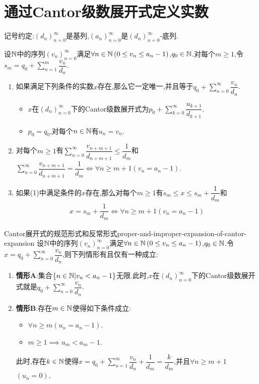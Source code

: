 \section{通过Cantor级数展开式定义实数}

记号约定:$\left(d_{n}\right)_{n=0}^{\infty}$是基列,$\left(a_{n}\right)_{n=0}^{\infty}$是$\left(d_{n}\right)_{n=0}^{\infty}$-底列.

\begin{lemma}{}{}
	设$\mathbb{N}$中的序列$\left(v_{n}\right)_{n=0}^{\infty}$满足$\forall n\in\mathbb{N}\left(0\leq v_{n}\leq a_{n}-1\right)$,$q_{0}\in\mathbb{N}$.对每个$m\geq 1$,令$s_{m}=q_{0}+\sum\limits_{n=1}^{m}\dfrac{v_{n}}{d_{n}}.$
	\begin{enumerate}
		\item 如果满足下列条件的实数$x$存在,那么它一定唯一,并且等于$q_{0}+\sum\limits_{n=0}^{\infty}\dfrac{v_{n}}{d_{n}}$.
		\begin{itemize}
			\item $x$在$\left(d_{n}\right)_{n=0}^{\infty}$下的Cantor级数展开式为$p_{0}+\sum\limits_{k=0}^{\infty}\dfrac{u_{k+1}}{d_{k+1}}$.
			\item $p_{0}=q_{0}$,对每个$n\in\mathbb{N}$有$u_{n}=v_{n}$.
		\end{itemize}
		\item 对每个$m\geq 1$有$\sum\limits_{n=0}^{\infty}\dfrac{v_{n+m+1}}{d_{n+m+1}}\leq\dfrac{1}{d_{m}}$和$\sum\limits_{n=0}^{\infty}\dfrac{v_{n+m+1}}{d_{n+m+1}}=\dfrac{1}{d_{m}}\iff\forall n\geq m+1\left(v_{n}=a_{n}-1\right)$.
		\item 如果(1)中满足条件的$x$存在,那么对每个$m\geq 1$有$s_{m}\leq x\leq s_{m}+\dfrac{1}{d_{m}}$和
		\begin{align*}
			x=s_{m}+\dfrac{1}{d_{m}}\iff\forall n\geq m+1\left(v_{n}=a_{n}-1\right)
		\end{align*}
	\end{enumerate}
\end{lemma}

\begin{theorem}{Cantor展开式的规范形式和反常形式}{proper-and-improper-expansion-of-cantor-expansion}
	设$\mathbb{N}$中的序列$\left(v_{n}\right)_{n=0}^{\infty}$满足$\forall n\in\mathbb{N}\left(0\leq v_{n}\leq a_{n}-1\right)$,$q_{0}\in\mathbb{N}$.令$x=q_{0}+\sum\limits_{n=0}^{\infty}\dfrac{v_{n}}{d_{n}}$,则下列情形有且仅有一种成立:
	\begin{enumerate}
		\item \textbf{情形A}:集合$\left\{n\in\mathbb{N}\middle|v_{n}<a_{n}-1\right\}$无限.此时,$x$在$\left(d_{n}\right)_{n=0}^{\infty}$下的Cantor级数展开式就是$q_{0}+\sum\limits_{n=0}^{\infty}\dfrac{v_{n}}{d_{n}}$.
		\item \textbf{情形B}:存在$m\in\mathbb{N}$使得如下条件成立:
		\begin{itemize}
			\item $\forall n\geq m\left(u_{n}=a_{n}-1\right)$.
			\item $m\geq 1\implies u_{m}<a_{m}-1$.
		\end{itemize}
		此时,存在$k\in\mathbb{N}$使得$x=q_{0}+\sum\limits_{n=1}^{m}\dfrac{v_{n}}{d_{n}}+\dfrac{1}{d_{m}}=\dfrac{k}{d_{m}}$,并且$\forall n\geq m+1$$\left(u_{n}=0\right)$.
	\end{enumerate}
\end{theorem}

